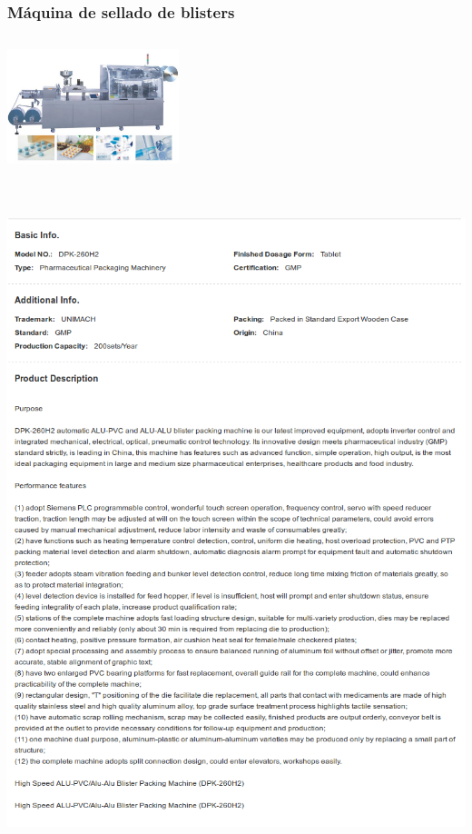 \subsubsection{Máquina de sellado de blisters}
\includegraphics[width=5cm,height=4cm,keepaspectratio]{Datasheets/5Foto.png} 
\\
\includegraphics[width=15cm,height=20cm,keepaspectratio]{Datasheets/5MaquinaBlisters.png} 
\newpage

